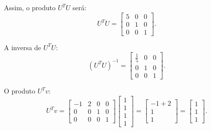 \begin{resolution}
\begin{enumerate}[label=\alph*)]
          Assim, o produto \( U^T U \) será:
          \[
            U^T U = \begin{bmatrix}
              5 & 0 & 0 \\
              0 & 1 & 0 \\
              0 & 0 & 1
            \end{bmatrix}.
          \]

          A inversa de \( U^T U \):
          \[
            (U^T U)^{-1} = \begin{bmatrix}
              \frac{1}{5} & 0 & 0 \\
              0           & 1 & 0 \\
              0           & 0 & 1
            \end{bmatrix}.
          \]

          O produto \( U^T v \):
          \[
            U^T v = \begin{bmatrix}
              -1 & 2 & 0 & 0 \\
              0  & 0 & 1 & 0 \\
              0  & 0 & 0 & 1
            \end{bmatrix}
            \begin{bmatrix}
              1 \\ 1 \\ 1 \\ 1
            \end{bmatrix} =
            \begin{bmatrix}
              -1 + 2 \\ 1 \\ 1
            \end{bmatrix} =
            \begin{bmatrix}
              1 \\ 1 \\ 1
            \end{bmatrix}.
          \]


\end{enumerate}
\end{resolution}
